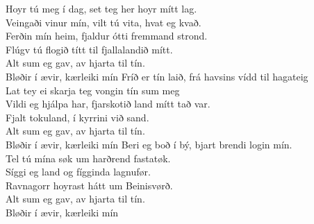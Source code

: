\begin{flushleft}
Hoyr tú meg í dag, set teg her hoyr mítt lag.\\
Veingaði vinur mín, vilt tú vita, hvat eg kvað.\\
Ferðin mín heim, fjaldur ótti fremmand strond.\\
Flúgv tú flogið títt til fjallalandið mítt.
\hops
\hspace{0.9cm}\\
\hspace{0.9cm}Alt sum eg gav, av hjarta til tín.\\
\hspace{0.9cm}Bløðir í ævir, kærleiki mín
\hops
Fríð er tín laið, frá havsins vídd til hagateig\\
Lat tey ei skarja teg vongin tín sum meg\\
Vildi eg hjálpa har, fjarskotið land mítt tað var.\\
Fjalt tokuland, í kyrrini við sand.
\hops
\hspace{0.9cm}\\
\hspace{0.9cm}Alt sum eg gav, av hjarta til tín.\\
\hspace{0.9cm}Bløðir í ævir, kærleiki mín
\hops
Beri eg boð í bý, bjart brendi login mín.\\
Tel tú mína søk um harðrend fastatøk.\\
Síggi eg land og fígginda lagnufør.\\
Ravnagorr hoyrast hátt um Beinisvørð.
\hops
\hspace{0.9cm}\\
\hspace{0.9cm}Alt sum eg gav, av hjarta til tín.\\
\hspace{0.9cm}Bløðir í ævir, kærleiki mín
\end{flushleft}
\newpage

